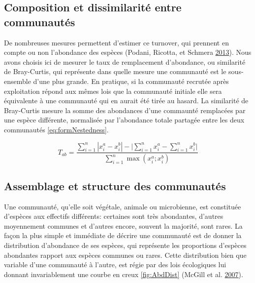 \documentclass[11pt,french,A4paper,extrafontsizes,onecolumn,openright]{memoir}
\begin{document}
\subsection{Composition et dissimilarité entre
communautés}\label{composition-et-dissimilarite-entre-communautes}

De nombreuses mesures permettent d'estimer ce turnover, qui prennent en
compte ou non l'abondance des espèces (Podani, Ricotta, et Schmera
\protect\hyperlink{ref-Podani2013}{2013}). Nous avons choisis ici de
mesurer le taux de remplacement d'abondance, ou similarité de
Bray-Curtis, qui représente dans quelle mesure une communauté est le
sous-ensemble d'une plus grande. En pratique, si la communauté recrutée
après exploitation répond aux mêmes lois que la communauté initiale elle
sera équivalente à une communauté qui en aurait été tirée au hasard. La
similarité de Bray-Curtis mesure la somme des abondances d'une commaunté
remplacées par une espèce différente, normalisée par l'abondance totale
partagée entre les deux communautés \eqref{eq:formNestedness}.

\begin{equation}
T_{ab}=\frac{\sum_{i=1}^{n}|x_i^a - x_i^b| - \bigg| \sum_{i=1}^{n}{x_i^a} - \sum_{i=1}^{n}{x_i^b} \bigg|}{\sum_{i=1}^{n}\max{\left( x_i^a;x_i^b \right)}}
\label{eq:formNestedness}
\end{equation}

\subsection{Assemblage et structure des
communautés}\label{AbundanceDistribution}

Une communauté, qu'elle soit végétale, animale ou microbienne, est
constituée d'espèces aux effectifs différents: certaines sont très
abondantes, d'autres moyennement communes et d'autres encore, souvent la
majorité, sont rares. La façon la plus simple et immédiate de décrire
une communauté est de donner la distribution d'abondance de ses espèces,
qui représente les proportions d'espèces abondantes rapport aux espèces
communes ou rares. Cette distribution bien que variable d'une communauté
à l'autre, est régie par des lois écologiques lui donnant invariablement
une courbe en creux \ref{fig:AbdDist} (McGill et al.
\protect\hyperlink{ref-McGill2007}{2007}).
\end{document}
